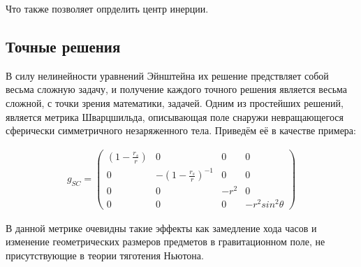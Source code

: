 \documentclass{article}
\begin{document}
		Что также позволяет опрделить центр инерции.

	\subsection{Точные решения}

		В силу нелинейности уравнений Эйнштейна их решение предствляет собой весьма сложную задачу, и получение каждого точного решения является весьма сложной, с точки зрения математики, задачей. Одним из простейших решений, является метрика Шварцшильда, описывающая поле снаружи невращающегося сферически симметричного незаряженного тела. Приведём её в качестве примера:

		\begin{align*}
			g_{SC} =
			\left( \begin{array}{cccc}
				(1-\frac{r_s}{r}) & 0                       & 0    & 0                \\
				0                 & -(1-\frac{r_s}{r})^{-1} & 0    & 0                \\
				0                 & 0                       & -r^2 & 0                \\
				0                 & 0                       & 0    & -r^2 sin^2 \theta 
			\end{array} \right)
		\end{align*}

		В данной метрике очевидны такие эффекты как замедление хода часов и изменение геометрических размеров предметов в гравитационном поле, не присутствующие в теории тяготения Ньютона. 
\end{document}

